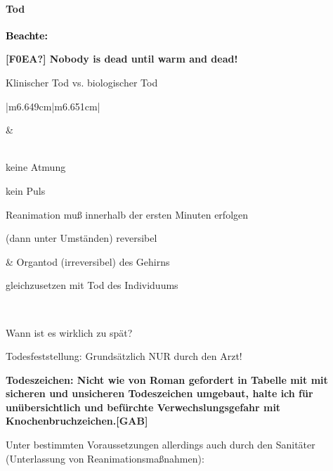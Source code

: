 \documentclass{article}
\newcommand\gEs[1]{\textbf{\textcolor[rgb]{0.0,0.0,0.5019608}{#1}}}
\newcommand\gEs[1]{\textbf{\textcolor[rgb]{0.0,0.0,0.5019608}{#1}}}
\newcommand\gCa[1]{\textbf{\textcolor{black}{#1}}}
\begin{document}
\paragraph{Tod}
{\mdseries\color{black}
\gCa{Beachte:}}

{\centering\color{black}
\gEs{[F0EA?] }\gEs{Nobody is dead
until warm and dead!}
\par}

{\mdseries\color{black}
Klinischer Tod vs. biologischer Tod}

\begin{center}
\tablehead{}\begin{supertabular}{|m{6.649cm}|m{6.651cm}|}
\hline
{}\par

 &
\par

\\\hline
{\mdseries keine Atmung}

{\mdseries kein Puls}

{\mdseries Reanimation mu{\ss} innerhalb der ersten  Minuten erfolgen}

{\mdseries (dann unter Umst\"anden) reversibel}

 &
{\mdseries Organtod (irreversibel) des Gehirns}

{\mdseries gleichzusetzen mit Tod des Individuums}

\\\hline
\end{supertabular}
\end{center}
{\mdseries\color{black}
Wann ist es wirklich zu sp\"at?}

{\mdseries
Todesfeststellung: Grunds\"atzlich NUR durch den Arzt!}

{\bfseries\color[rgb]{0.5019608,0.0,0.0}
Todeszeichen: Nicht wie von Roman gefordert in Tabelle mit mit sicheren
und unsicheren Todeszeichen umgebaut, halte ich f\"ur un\"ubersichtlich
und bef\"urchte Verwechslungsgefahr mit Knochenbruchzeichen.[GAB]}

{\mdseries
Unter bestimmten Voraussetzungen allerdings auch durch den Sanit\"ater
(Unter\-lassung von  Reanimationsma{\ss}nahmen):}
\end{document}
